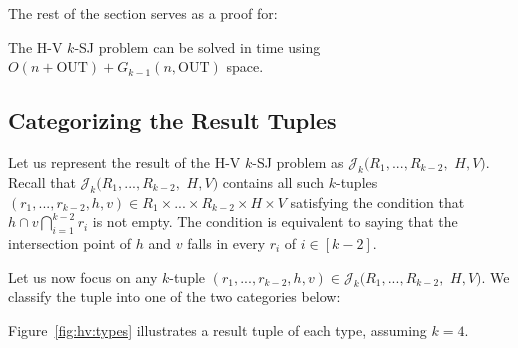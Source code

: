 \documentclass[sigconf]{acmart}
\def\vgap{\vspace{1mm}}
\def\J{\mathcal{J}}
\def\out{\mathrm{OUT}}
\begin{document}
\vgap

The rest of the section serves as a proof for: 

\begin{lemma} \label{lmm:hv}
    The H-V $k$-SJ problem can be solved in 
    \myeqn{
        O(k) \cdot \big( F_{k-1}(n, \out) + n\log n + \out \big) \nn 
    }
    time using $O(n + \out) + G_{k-1}(n, \out)$ space.
\end{lemma}

\subsection{Categorizing the Result Tuples} \label{sec:hv:result-part}

Let us represent the result of the H-V $k$-SJ problem as $\J_k(R_1, ..., R_{k-2},$ $H, V)$. Recall that $\J_k(R_1, ..., R_{k-2},$ $H, V)$ contains all such $k$-tuples $(r_1, ..., r_{k-2}, h, v) \in R_1 \times ... \times R_{k-2} \times H \times V$ satisfying the condition that $h \cap v \bigcap_{i=1}^{k-2} r_i$ is not empty. The condition is equivalent to saying that the intersection point of $h$ and $v$ falls in every $r_i$ of $i \in [k-2]$.

\vgap

Let us now focus on any $k$-tuple $(r_1, ..., r_{k-2}, h, v) \in  \J_k(R_1, ..., R_{k-2},$ $H, V)$. We classify the tuple into one of the two categories below: 

Figure~\ref{fig:hv:types} illustrates a result tuple of each type, assuming $k = 4$.
\end{document}
